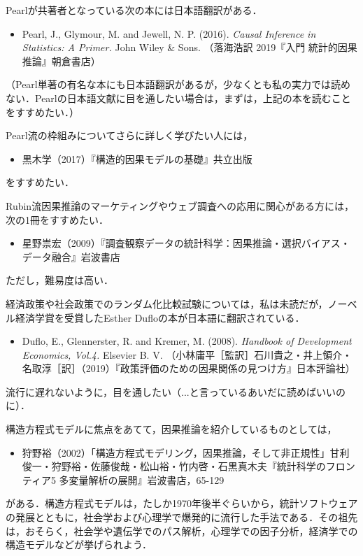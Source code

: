 \documentclass[12pt]{jsarticle}
\begin{document}
Pearlが共著者となっている次の本には日本語翻訳がある．

\begin{itemize}
\item[] Pearl, J., Glymour, M. and Jewell, N. P. (2016). {\it Causal Inference in Statistics: A Primer.} John Wiley \& Sons. （落海浩訳 2019『入門 統計的因果推論』朝倉書店）
\end{itemize}

（Pearl単著の有名な本にも日本語翻訳があるが，少なくとも私の実力では読めない．Pearlの日本語文献に目を通したい場合は，まずは，上記の本を読むことをすすめたい．）

Pearl流の枠組みについてさらに詳しく学びたい人には，
\begin{itemize}
\item[] 黒木学（2017）『構造的因果モデルの基礎』共立出版
\end{itemize}
をすすめたい．

Rubin流因果推論のマーケティングやウェブ調査への応用に関心がある方には，次の1冊をすすめたい．
\begin{itemize}
\item[] 星野祟宏（2009）『調査観察データの統計科学：因果推論・選択バイアス・データ融合』岩波書店
\end{itemize}
ただし，難易度は高い．

経済政策や社会政策でのランダム化比較試験については，私は未読だが，ノーベル経済学賞を受賞したEsther Dufloの本が日本語に翻訳されている．
\begin{itemize}
\item[] Duflo, E., Glennerster, R. and Kremer, M. (2008). {\it Handbook of Development Economics, Vol.4.} Elsevier B. V. （小林庸平［監訳］石川貴之・井上領介・名取淳［訳］（2019）『政策評価のための因果関係の見つけ方』日本評論社）
\end{itemize}
流行に遅れないように，目を通したい（...と言っているあいだに読めばいいのに）．

構造方程式モデルに焦点をあてて，因果推論を紹介しているものとしては，
\begin{itemize}
\item[] 狩野裕（2002）「構造方程式モデリング，因果推論，そして非正規性」甘利俊一・狩野裕・佐藤俊哉・松山裕・竹内啓・石黒真木夫『統計科学のフロンティア5 多変量解析の展開』岩波書店，65-129
\end{itemize}
がある．構造方程式モデルは，たしか1970年後半ぐらいから，統計ソフトウェアの発展とともに，社会学および心理学で爆発的に流行した手法である．その祖先は，おそらく，社会学や遺伝学でのパス解析，心理学での因子分析，経済学での構造モデルなどが挙げられよう．
\end{document}
